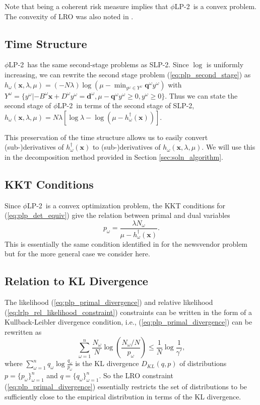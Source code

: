 \documentclass[11pt]{article}
\newcommand{\x}{\mathbf{x}}
\newcommand{\q}{\mathbf{q}}
\renewcommand{\d}{\mathbf{d}}
\newcommand{\plp}{$\phi$LP-2}
\begin{document}
Note that being a coherent risk measure implies that \plp\ is a convex problem.
The convexity of LRO was also noted in \cite{wang2010likelihood}.

\subsection{Time Structure}
\plp\ has the same second-stage problems as SLP-2.
Since $\log$ is uniformly increasing, we can rewrite the second stage problem (\ref{eq:plp_second_stage}) as $h_\omega(\x,\lambda,\mu) = (-N\lambda) \log(\mu - \min_{y^\omega \in Y^\omega} \q^\omega y^\omega )$ with $Y^\omega = \{y^\omega | -B^\omega \x + D^\omega y^\omega = \d^\omega, \mu - \q^\omega y^\omega \geq 0, y^\omega \geq 0\}$.
Thus we can state the second stage of \plp\ in terms of the second stage of SLP-2, $h_\omega(\x,\lambda,\mu) = N\lambda\left[\log\lambda - \log(\mu - h^\dagger_\omega(\x))\right]$.

This preservation of the time structure allows us to easily convert \mbox{(sub-)derivatives} of $h^\dagger_\omega(\x)$ to \mbox{(sub-)derivatives} of $h_\omega(\x,\lambda,\mu)$.
We will use this in the decomposition method provided in Section \ref{sec:soln_algorithm}.

\subsection{KKT Conditions}
Since \plp\ is a convex optimization problem, the KKT conditions for (\ref{eq:plp_det_equiv}) give the relation between primal and dual variables
\begin{equation}
	p_\omega = \frac{\lambda N_\omega}{\mu - h^\dagger_\omega(\x)}. \label{eq:kkt}
\end{equation}
This is essentially the same condition identified in \cite{wang2010likelihood} for the newsvendor problem but for the more general case we consider here.

\subsection{Relation to KL Divergence}
The likelihood (\ref{eq:plp_primal_divergence}) and relative likelihood (\ref{eq:lrlp_rel_likelihood_constraint}) constraints can be written in the form of a Kullback-Leibler divergence condition, i.e., (\ref{eq:plp_primal_divergence}) can be rewritten as
\[
	\sum_{\omega=1}^n \frac{N_\omega}{N} \log\left( \frac{N_\omega/N}{p_\omega} \right) \leq \frac{1}{N} \log \frac{1}{\gamma'},
\]
where $\sum_{\omega=1}^n q_\omega \log \frac{q_\omega}{p_\omega}$ is the KL divergence $D_{KL}(q,p)$ of distributions $p = \{p_\omega\}_{\omega=1}^n$ and $q = \{q_\omega\}_{\omega=1}^n$.
So the LRO constraint (\ref{eq:plp_primal_divergence}) essentially restricts the set of distributions to be sufficiently close to the empirical distribution in terms of the KL divergence.
\end{document}
